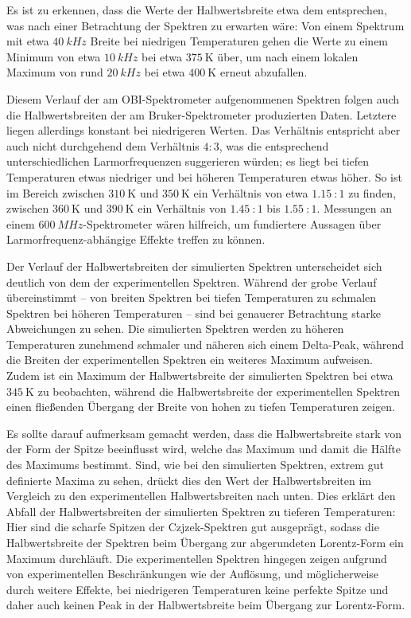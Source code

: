 Es ist zu erkennen, dass die Werte der Halbwertsbreite etwa dem entsprechen, was nach einer Betrachtung der Spektren zu erwarten wäre: Von einem Spektrum mit etwa $\SI{40}{kHz}$ Breite bei niedrigen Temperaturen gehen die Werte zu einem Minimum von etwa $\SI{10}{kHz}$ bei etwa $\SI{375}{\kelvin}$ über, um nach einem lokalen Maximum von rund $\SI{20}{kHz}$ bei etwa $\SI{400}{\kelvin}$ erneut abzufallen.

Diesem Verlauf der am OBI-Spektrometer aufgenommenen Spektren folgen auch die Halbwertsbreiten der am Bruker-Spektrometer produzierten Daten. Letztere liegen allerdings konstant bei niedrigeren Werten. Das Verhältnis entspricht aber auch nicht durchgehend dem Verhältnis $4:3$, was die entsprechend unterschiedlichen Larmorfrequenzen suggerieren würden; es liegt bei tiefen Temperaturen etwas niedriger und bei höheren Temperaturen etwas höher. So ist im Bereich zwischen $\SI{310}{\kelvin}$ und $\SI{350}{\kelvin}$ ein Verhältnis von etwa $\SI{1.15}{}:1$ zu finden, zwischen $\SI{360}{\kelvin}$ und $\SI{390}{\kelvin}$ ein Verhältnis von $\SI{1.45}{}:1$ bis $\SI{1.55}{}:1$. Messungen an einem $\SI{600}{MHz}$-Spektrometer wären hilfreich, um fundiertere Aussagen über Larmorfrequenz-abhängige Effekte treffen zu können.

Der Verlauf der Halbwertsbreiten der simulierten Spektren unterscheidet sich deutlich von dem der experimentellen Spektren. Während der grobe Verlauf übereinstimmt -- von breiten Spektren bei tiefen Temperaturen zu schmalen Spektren bei höheren Temperaturen -- sind bei genauerer Betrachtung starke Abweichungen zu sehen. Die simulierten Spektren werden zu höheren Temperaturen zunehmend schmaler und näheren sich einem Delta-Peak, während die Breiten der experimentellen Spektren ein weiteres Maximum aufweisen. Zudem ist ein Maximum der Halbwertsbreite der simulierten Spektren bei etwa $\SI{345}{\kelvin}$ zu beobachten, während die Halbwertsbreite der experimentellen Spektren einen fließenden Übergang der Breite von hohen zu tiefen Temperaturen zeigen.

Es sollte darauf aufmerksam gemacht werden, dass die Halbwertsbreite stark von der Form der Spitze beeinflusst wird, welche das Maximum und damit die Hälfte des Maximums bestimmt. Sind, wie bei den simulierten Spektren, extrem gut definierte Maxima zu sehen, drückt dies den Wert der Halbwertsbreiten im Vergleich zu den experimentellen Halbwertsbreiten nach unten. Dies erklärt den Abfall der Halbwertsbreiten der simulierten Spektren zu tieferen Temperaturen: Hier sind die scharfe Spitzen der Czjzek-Spektren gut ausgeprägt, sodass die Halbwertsbreite der Spektren beim Übergang zur abgerundeten Lorentz-Form ein Maximum durchläuft. Die experimentellen Spektren hingegen zeigen aufgrund von experimentellen Beschränkungen wie der Auflösung, und möglicherweise durch weitere Effekte, bei niedrigeren Temperaturen keine perfekte Spitze und daher auch keinen Peak in der Halbwertsbreite beim Übergang zur Lorentz-Form.

